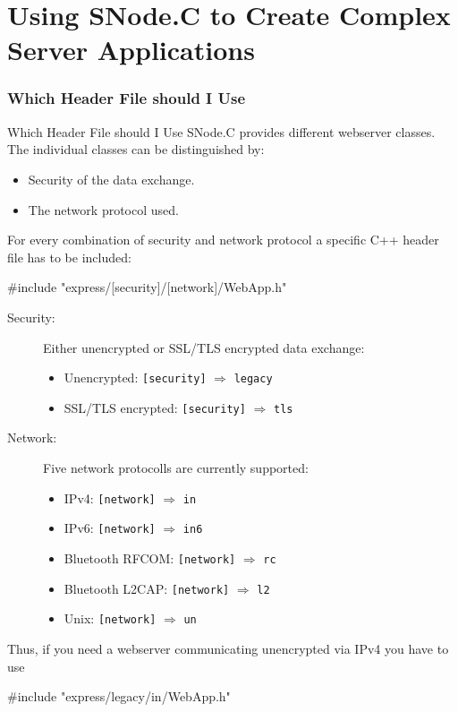 ﻿\part{Using SNode.C to Create Complex Server Applications}
\section[nosectionpage]{Which Header File should I Use}

\begin{frame}[fragile]{Which Header File should I Use}
  SNode.C provides different webserver classes. The individual classes can be distinguished by:
  \begin{itemize}
    \item Security of the data exchange.
    \item The network protocol used.
  \end{itemize}
  For every combination of security and network protocol a specific C++ header file has to be included:
  \begin{cppcode}[gobble=4]
    #include "express/[security]/[network]/WebApp.h"
  \end{cppcode}
  \begin{description}
    \item[Security:] Either unencrypted or SSL/TLS encrypted data exchange:
    \begin{itemize}
      \item Unencrypted: \texttt{\textcolor{fh-ooe-red}{[security]}} $\Rightarrow$ \texttt{\textcolor{fh-ooe-red}{legacy}}
      \item SSL/TLS encrypted: \texttt{\textcolor{fh-ooe-red}{[security]}} $\Rightarrow$ \texttt{\textcolor{fh-ooe-red}{tls}}
    \end{itemize}
    \item[Network:] Five network protocolls are currently supported:
    \begin{itemize}
      \item IPv4: \texttt{\textcolor{fh-ooe-red}{[network]}} $\Rightarrow$ \texttt{\textcolor{fh-ooe-red}{in}}
      \item IPv6: \texttt{\textcolor{fh-ooe-red}{[network]}} $\Rightarrow$ \texttt{\textcolor{fh-ooe-red}{in6}}
      \item Bluetooth RFCOM: \texttt{\textcolor{fh-ooe-red}{[network]}} $\Rightarrow$ \texttt{\textcolor{fh-ooe-red}{rc}}
      \item Bluetooth L2CAP: \texttt{\textcolor{fh-ooe-red}{[network]}} $\Rightarrow$ \texttt{\textcolor{fh-ooe-red}{l2}}
      \item Unix: \texttt{\textcolor{fh-ooe-red}{[network]}} $\Rightarrow$ \texttt{\textcolor{fh-ooe-red}{un}}
    \end{itemize}
  \end{description}
  \vspace{0.5cm}
  Thus, if you need a webserver communicating unencrypted via IPv4 you have to use
  \begin{cppcode}[gobble=4]
    #include "express/legacy/in/WebApp.h"
  \end{cppcode}
\end{frame}
